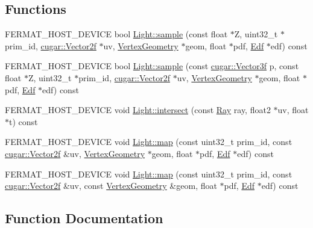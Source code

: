 \subsection*{Functions}
\begin{DoxyCompactItemize}
\item 
F\+E\+R\+M\+A\+T\+\_\+\+H\+O\+S\+T\+\_\+\+D\+E\+V\+I\+CE bool \hyperlink{group___lights_module_ga67cc240bcda4b08efd26c8727144bf16}{Light\+::sample} (const float $\ast$Z, uint32\+\_\+t $\ast$prim\+\_\+id, \hyperlink{structcugar_1_1_vector}{cugar\+::\+Vector2f} $\ast$uv, \hyperlink{struct_vertex_geometry}{Vertex\+Geometry} $\ast$geom, float $\ast$pdf, \hyperlink{struct_edf}{Edf} $\ast$edf) const
\item 
F\+E\+R\+M\+A\+T\+\_\+\+H\+O\+S\+T\+\_\+\+D\+E\+V\+I\+CE bool \hyperlink{group___lights_module_gaa3cac39418d2c62c2faaa4cb7c380ff7}{Light\+::sample} (const \hyperlink{structcugar_1_1_vector}{cugar\+::\+Vector3f} p, const float $\ast$Z, uint32\+\_\+t $\ast$prim\+\_\+id, \hyperlink{structcugar_1_1_vector}{cugar\+::\+Vector2f} $\ast$uv, \hyperlink{struct_vertex_geometry}{Vertex\+Geometry} $\ast$geom, float $\ast$pdf, \hyperlink{struct_edf}{Edf} $\ast$edf) const
\item 
F\+E\+R\+M\+A\+T\+\_\+\+H\+O\+S\+T\+\_\+\+D\+E\+V\+I\+CE void \hyperlink{group___lights_module_ga6a7452cab8b733d48174016b845f8d53}{Light\+::intersect} (const \hyperlink{struct_ray}{Ray} ray, float2 $\ast$uv, float $\ast$t) const
\item 
F\+E\+R\+M\+A\+T\+\_\+\+H\+O\+S\+T\+\_\+\+D\+E\+V\+I\+CE void \hyperlink{group___lights_module_gaf14a70f7d23b422f8953bc55d1eade44}{Light\+::map} (const uint32\+\_\+t prim\+\_\+id, const \hyperlink{structcugar_1_1_vector}{cugar\+::\+Vector2f} \&uv, \hyperlink{struct_vertex_geometry}{Vertex\+Geometry} $\ast$geom, float $\ast$pdf, \hyperlink{struct_edf}{Edf} $\ast$edf) const
\item 
F\+E\+R\+M\+A\+T\+\_\+\+H\+O\+S\+T\+\_\+\+D\+E\+V\+I\+CE void \hyperlink{group___lights_module_ga96c94d76b5464c0433e8e071645cfe48}{Light\+::map} (const uint32\+\_\+t prim\+\_\+id, const \hyperlink{structcugar_1_1_vector}{cugar\+::\+Vector2f} \&uv, const \hyperlink{struct_vertex_geometry}{Vertex\+Geometry} \&geom, float $\ast$pdf, \hyperlink{struct_edf}{Edf} $\ast$edf) const
\end{DoxyCompactItemize}


\subsection{Function Documentation}
\mbox{\label{group___lights_module_ga6a7452cab8b733d48174016b845f8d53}} 
